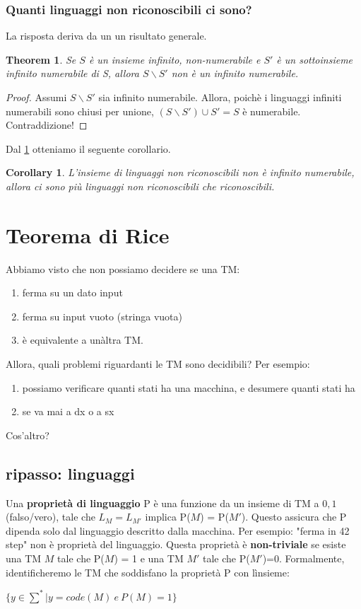 \documentclass[a4paper, 12pt]{article}
\newtheorem{theorem}{Theorem}[section]
\newtheorem{corollary}{Corollary}[theorem]
\begin{document}
\subsubsection{Quanti linguaggi non riconoscibili ci sono?}
La risposta deriva da un  un risultato generale.
\begin{theorem}
\label{th:3}
Se $S$ \`e un insieme infinito, non-numerabile e $S'$ \`e un sottoinsieme infinito numerabile di S, allora $S \backslash S'$ non \`e un infinito numerabile.
\end{theorem}
\begin{proof}
Assumi $S \backslash S'$ sia infinito numerabile. Allora, poich\`e i linguaggi infiniti numerabili sono chiusi per unione, $(S \backslash S') \cup S' = S$ \`e numerabile. Contraddizione!
\end{proof}
Dal \ref{th:3} otteniamo il seguente corollario.
\begin{corollary}
L'insieme di linguaggi non riconoscibili non \`e infinito numerabile, allora ci sono pi\`u linguaggi non riconoscibili che riconoscibili.
\end{corollary}
\newpage

\section{Teorema di Rice}
Abbiamo visto che non possiamo decidere se una TM: \begin{enumerate}
\item ferma su un dato input
\item ferma su input vuoto (stringa vuota)
\item \`e equivalente a un\`altra TM.
\end{enumerate}
Allora, quali problemi riguardanti le TM sono decidibili?
Per esempio: \begin{enumerate}
\item possiamo verificare quanti stati ha una macchina, e desumere quanti stati ha
\item se va mai a dx o a sx
\end{enumerate}
Cos'altro?
\subsection{ripasso: linguaggi}
Una \textbf{propriet\`a di linguaggio} P \`e una funzione da un insieme di TM a ${0,1}$ (falso/vero), tale che $L_M = L_{M'}$ implica P($M$) = P($M'$).
Questo assicura che P dipenda solo dal linguaggio descritto dalla macchina. Per esempio: "ferma in 42 step" non \`e propriet\`a del linguaggio.
Questa propriet\`a \`e \textbf{non-triviale} se esiste una TM $M$ tale che P($M$) = 1 e una TM $M'$ tale che P($M'$)=0. Formalmente, identificheremo le TM che soddisfano la propriet\`a P con l\`insieme: \begin{center}
$\{y \in \sum^* | y=code(M)\ e\ P(M)=1\}$
\end{center} 
\end{document}
